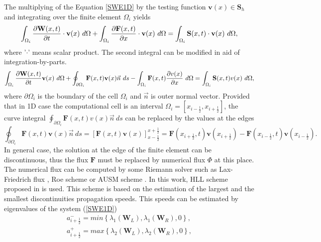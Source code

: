 The multiplying of the Equation \ref{SWE1D} by the testing function $\textbf{v}(x)\in \mathbf{S}_h$ and integrating over the finite element $\Omega_i$ yields
\begin{equation}\label{testF}
\int_{\Omega_i}\parc{\mathbf{W}(x,t)}{t} \cdot \textbf{v}(x)  \ d\Omega +\int_{\Omega_i} \parc{\mathbf{F}(x,t)}{x} \cdot \mathbf{v}(x) \ d\Omega=\int_{\Omega_i}\mathbf{S}(x,t) \cdot \textbf{v}(x) \ d\Omega,
\end{equation}
where '$\cdot$' means scalar product. The second integral can be modified in aid of integration-by-parts.
\begin{equation}\label{testF1D}
\int_{\Omega_i}\parc{\mathbf{W}(x,t)}{t} \textbf{v}(x)  \ d\Omega +\oint_{\partial \Omega_i} \mathbf{F}(x,t) \textbf{v}(x) \vec{n} \ ds-\int_{\Omega_i} \mathbf{F}(x,t)\parc{v(x)}{x} \ d\Omega=\int_{\Omega_i}\mathbf{S}(x,t)v(x) \ d\Omega,
\end{equation}
where $\partial \Omega_i$ is the boundary of the cell $\Omega_i$ and $\vec{n}$ is outer normal vector. Provided that in 1D case the computational cell is an interval $\Omega_i=[x_{i-\frac12},x_{i+\frac12}]$, the curve integral $\oint_{\partial \Omega_i} \mathbf{F}(x,t) v(x)\vec{n} \ ds$ can be replaced by the values at the edges
\begin{equation}
\oint_{\partial \Omega_i} \mathbf{F}(x,t) \mathbf{v}(x)\vec{n} \ ds=\left[ \mathbf{F}(x,t) \mathbf{v}(x)\right]_{x-\frac12}^{x+\frac12}= \mathbf{F}(x_{i+\frac12},t) \mathbf{v}(x_{i+\frac12})-\mathbf{F}(x_{i-\frac12},t) \mathbf{v}(x_{i-\frac12}).
\end{equation}
In general case, the solution at the edge of the finite element can be discontinuous, thus the flux $\mathbf{F}$  must be replaced by numerical flux $\Phi$ at this place. The numerical flux can be computed by some Riemann solver such as Lax-Friedrich flux \cite{Lax1954}, Roe scheme \cite{roe} or AUSM scheme \cite{ausm}. In this work, HLL scheme proposed in \cite{harten1983} is used. This scheme is based on the estimation of the largest and the smallest discontinuities propagation speeds. This speeds can be estimated by eigenvalues of the system (\ref{SWE1D})
\begin{equation}\label{rychlosticky}
 \begin{array}{ccc}
a_{i+\frac12}^-=min\left\{\lambda_1\left(\mathbf{W}_L\right),\lambda_1\left(\mathbf{W}_R\right),0\right\},\\
a_{i+\frac12}^+=max\left\{\lambda_2\left(\mathbf{W}_L\right),\lambda_2\left(\mathbf{W}_R\right),0\right\},
\end{array}
\end{equation}
